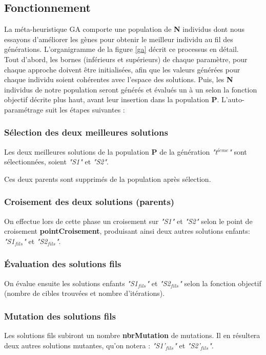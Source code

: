 \subsection{Fonctionnement}
La méta-heuristique GA comporte une population de \textbf{N} individus dont nous essayons d'améliorer les gènes pour obtenir le meilleur individu au fil des générations.
L'organigramme de la figure \ref{ga} décrit ce processus en détail.\\

Tout d'abord, les bornes (inférieurs et supérieurs) de chaque paramètre, pour chaque approche doivent être initialisées, afin que les valeurs générées pour chaque individu soient cohérentes avec l'espace des solutions.
Puis, les \textbf{N} individus de notre population seront générés et évalués un à un selon la fonction objectif décrite plus haut, avant leur insertion dans la population \textbf{P}.
L'auto-paramétrage suit les étapes suivantes :

\subsubsection{Sélection des deux meilleures solutions}
Les deux meilleures solutions de la population \textbf{P} de la  génération \textit{"t$^{i\grave{e}me}$"} sont sélectionnées, soient \textit{"S1"} et \textit{"S2"}.

Ces deux parents sont supprimés de la population après sélection.

\subsubsection{Croisement des deux solutions (parents)}
On effectue lors de cette phase un croisement sur \textit{"S1"} et \textit{"S2"} selon le point de croisement \textbf{pointCroisement}, produisant ainsi deux autres solutions enfants: \textit{"S1$_{fils}$"} et \textit{"S2$_{fils}$"}. 

\subsubsection{Évaluation des solutions fils}
On évalue ensuite les solutions enfants \textit{"S1$_{fils}$"} et \textit{"S2$_{fils}$"} selon la fonction objectif (nombre de cibles trouvées et nombre d'itérations).

\subsubsection{Mutation des solutions fils} 
Les solutions fils subiront un nombre \textbf{nbrMutation} de mutations. Il en résultera deux autres solutions mutantes, qu'on notera : \textit{"S1'$_{fils}$"} et \textit{"S2'$_{fils}$"}. 

